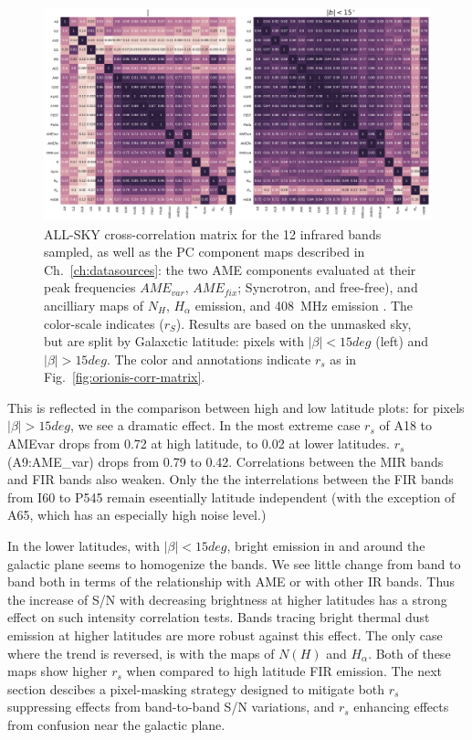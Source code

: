           \begin{figure}
            \includegraphics[width=\textwidth]{../Plots/ch_allsky/all_bands_corr_matrix_wAME_spearmanintensity_unmasked.pdf}
            \centering
            \caption{ALL-SKY cross-correlation matrix for the 12 infrared bands sampled, as well as the PC component maps described in Ch.~\ref{ch:datasources}: the two AME components evaluated at their peak frequencies $AME_{var}$, $AME_{fix}$; Syncrotron, and free-free), and ancilliary maps of $N_{H}$, $H_{\alpha}$ emission, and 408~MHz emission \cite{haslam82}. The color-scale indicates ($r_{S}$). Results are based on the unmasked sky, but are split by Galaxctic latitude: pixels with $|\beta| < 15deg$ (left) and $|\beta| > 15deg$. The color and annotations indicate $r_{s}$ as in Fig.~\ref{fig:orionis-corr-matrix}. }
            \label{fig:all_bands_corr_matrix_wAME_spearman}
          \end{figure}
        This is reflected in the comparison between high and low latitude plots: for pixels $|\beta| > 15deg$, we see a dramatic effect. In the most extreme case $r_{s}$ of A18 to AMEvar drops from 0.72 at high latitude, to 0.02 at lower latitudes. $r_{s}$(A9:AME_var) drops from 0.79 to 0.42. Correlations between the MIR bands and FIR bands also weaken. Only the the interrelations between the FIR bands from I60 to P545 remain eseentially latitude independent (with the exception of A65, which has an especially high noise level.)

        In the lower latitudes, with $|\beta| < 15deg$, bright emission in and around the galactic plane seems to homogenize the bands. We see little change from band to band both in terms of the relationship with AME or with other IR bands. Thus the increase of S/N with decreasing brightness at higher latitudes has a strong effect on such intensity correlation tests. Bands tracing bright thermal dust emission at higher latitudes are more robust against this effect. The only case where the trend is reversed, is with the maps of $N(H)$ and $H_{\alpha}$. Both of these maps show higher $r_{s}$ when compared to high latitude FIR emission. The next section descibes a pixel-masking strategy designed to mitigate both $r_{s}$ suppressing effects from band-to-band S/N variations, and $r_{s}$ enhancing effects from confusion near the galactic plane.

